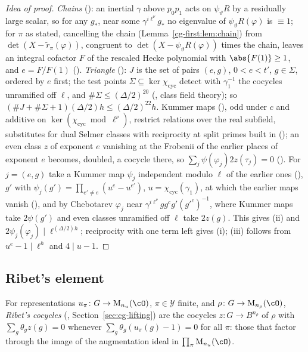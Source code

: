 \begin{proof}[Idea of proof]
\emph{Chains} (): an inertial $\gamma$
above $p_0p_1$ acts on $\psi_\vartheta R$ by a residually large scalar, so for any $g_*$, near some
$\gamma^{i\ell^\nu}g_*$ no eigenvalue of $\psi_\vartheta R(\varphi)$ is $\equiv1$; for $\pi$ as stated,
cancelling the chain (Lemma~\ref{cg-first:lem:chain}) from $\det(X-\tilde r_\pi(\varphi))$, congruent to
$\det(X-\psi_\vartheta R(\varphi))$ times the chain, leaves an integral cofactor $F$ of the
rescaled Hecke polynomial with $\abs{F(1)}\ge1$, and $e=F/F(1)$
().
\emph{Triangle} (): $J$ is the set of pairs $(e,g)$, $0<e<t'$,
$g\in\Sigma$, ordered by $e$ first; the test points $\Sigma\subseteq\ker\chi_{\mathrm{cyc}}$ detect with
$\gamma_1^{-1}$ the cocycles unramified off $\ell$, and $\#\Sigma\le(\Delta/2)^{20}$
(, class field theory); so $(\#J+\#\Sigma+1)(\Delta/2)h\le
(\Delta/2)^{22}h$. Kummer maps (), odd under $c$ and additive on
$\ker(\chi_{\mathrm{cyc}}\bmod\ell^\nu)$, restrict relations over the real subfield, substitutes for dual
Selmer classes with reciprocity at split primes built in (); an even
class $z$ of exponent $e$ vanishing at the Frobenii of the earlier places of exponent $e$ becomes, doubled,
a cocycle there, so $\sum_j\psi(\varphi_j)2z(\tau_j)=0$ (). For $j=(e,g)$ take a
Kummer map $\psi_j$ independent modulo $\ell$ of the earlier ones
(), $g'$ with
$\psi_j(g')=\prod_{e'\ne e}(u^e-u^{e'})$, $u=\chi_{\mathrm{cyc}}(\gamma_1)$, at which the earlier maps vanish
(), and by Chebotarev $\varphi_j$ near
$\gamma^{i\ell^\nu}gg^cg'(g'^c)^{-1}$, where Kummer maps take $2\psi(g')$ and even classes unramified off
$\ell$ take $2z(g)$. This gives (ii) and $2\psi_j(\varphi_j)\mid\ell^{(\Delta/2)h}$; reciprocity with one
term left gives (i); (iii) follows from $u^e-1\mid\ell^h$ and $4\mid u-1$.
\end{proof}

\subsection{Ribet's element}\label{cg-first:ss:ribet}

For representations $u_\pi\colon G\to\mathrm M_{n_u}(\cO)$, $\pi\in\mathcal Y$ finite, and $\rho\colon G\to\mathrm M_{n_\rho}(\cO)$,
\emph{Ribet's cocycles} (, Section~\ref{sec:cg-lifting}) are the
cocycles $z\colon G\to B^{n_\rho}$ of $\rho$ with $\sum_g\theta_gz(g)=0$ whenever $\sum_g\theta_g(u_\pi(g)-1)=0$ for
all $\pi$: those that factor through the image of the augmentation ideal in $\prod_\pi\mathrm M_{n_u}(\cO)$.

